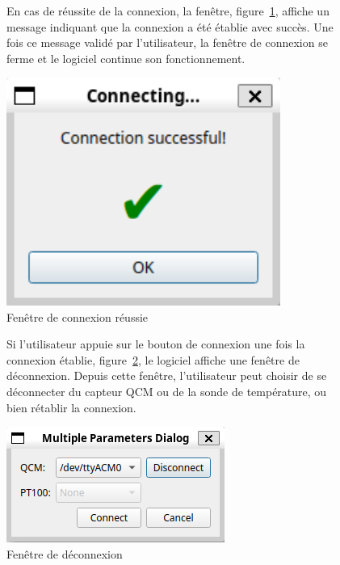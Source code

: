 \begin{figure}[H]
    \begin{minipage}{0.64\textwidth}
        En cas de réussite de la connexion, la fenêtre, figure~\ref{fig:connecting success}, affiche un message indiquant que la connexion a été établie avec succès.
        Une fois ce message validé par l'utilisateur, la fenêtre de connexion se ferme et le logiciel continue son fonctionnement.
    \end{minipage}\hfill
    \begin{minipage}{0.30\textwidth}
        \centering
        \includegraphics[width=0.8\textwidth]{assets/figures/ConnectingSuccess.png}
        \caption{Fenêtre de connexion réussie}
        \label{fig:connecting success}
    \end{minipage}
\end{figure}

\begin{figure}[H]
    \begin{minipage}{0.64\textwidth}
        Si l'utilisateur appuie sur le bouton de connexion une fois la connexion établie, figure~\ref{fig:disconnect window}, le logiciel affiche une fenêtre de déconnexion.
        Depuis cette fenêtre, l'utilisateur peut choisir de se déconnecter du capteur QCM ou de la sonde de température, ou bien rétablir la connexion.
    \end{minipage}\hfill
    \begin{minipage}{0.30\textwidth}
        \centering
        \includegraphics[width=\textwidth]{assets/figures/Disconnect.png}
        \caption{Fenêtre de déconnexion}
        \label{fig:disconnect window}
    \end{minipage}
\end{figure}
\newpage
